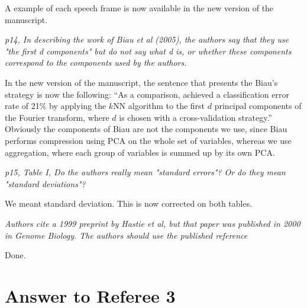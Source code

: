 \documentclass[a4paper,11pt]{article}
\begin{document}
A example of each speech frame is now available in the new version of the manuscript.

\emph{p14, In describing the work of Biau et al (2005), the authors say that they use "the first d components" but do not say what d is, or whether these components correspond to the components used by the authors.}

In the new version of the manuscript, the sentence that presents the Biau's strategy is now the following:
``As a comparison, \cite{Biau05} achieved a classification error rate of 21\% by applying the $k$NN algorithm to the first $d$ principal components of the Fourier transform, where $d$ is chosen with a cross-validation strategy.'' \\ Obviously the components of Biau are not the components we use, since Biau performs compression using PCA on the whole set of variables, whereas we use aggregation, where each group of variables is summed up by its own PCA.

\emph{p15, Table I, Do the authors really mean "standard errors"? Or do they mean "standard deviations"?}

We meant standard deviation. This is now corrected on both tables. 


\emph{Authors cite a 1999 preprint by Hastie et al, but that paper was published in 2000 in Genome Biology. The authors should use the published reference
}

Done.



\section{Answer to Referee 3}
\end{document}
